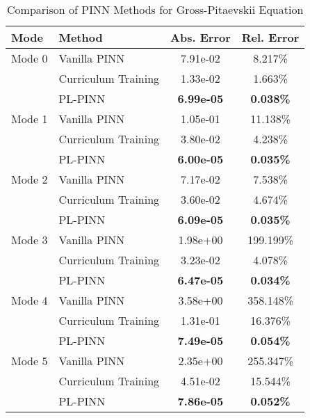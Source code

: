 \begin{table}[htbp]
\centering
\caption{Comparison of PINN Methods for Gross-Pitaevskii Equation}
\label{tab:pinn_comparison}
\begin{tabular}{llcc}
\toprule
Mode & Method & Abs. Error & Rel. Error \\
\midrule
Mode 0 & Vanilla PINN & 7.91e-02 & 8.217\% \\
 & Curriculum Training & 1.33e-02 & 1.663\% \\
 & PL-PINN & \textbf{6.99e-05} & \textbf{0.038\%} \\
\midrule
Mode 1 & Vanilla PINN & 1.05e-01 & 11.138\% \\
 & Curriculum Training & 3.80e-02 & 4.238\% \\
 & PL-PINN & \textbf{6.00e-05} & \textbf{0.035\%} \\
\midrule
Mode 2 & Vanilla PINN & 7.17e-02 & 7.538\% \\
 & Curriculum Training & 3.60e-02 & 4.674\% \\
 & PL-PINN & \textbf{6.09e-05} & \textbf{0.035\%} \\
\midrule
Mode 3 & Vanilla PINN & 1.98e+00 & 199.199\% \\
 & Curriculum Training & 3.23e-02 & 4.078\% \\
 & PL-PINN & \textbf{6.47e-05} & \textbf{0.034\%} \\
\midrule
Mode 4 & Vanilla PINN & 3.58e+00 & 358.148\% \\
 & Curriculum Training & 1.31e-01 & 16.376\% \\
 & PL-PINN & \textbf{7.49e-05} & \textbf{0.054\%} \\
\midrule
Mode 5 & Vanilla PINN & 2.35e+00 & 255.347\% \\
 & Curriculum Training & 4.51e-02 & 15.544\% \\
 & PL-PINN & \textbf{7.86e-05} & \textbf{0.052\%} \\
\bottomrule
\end{tabular}
\end{table}